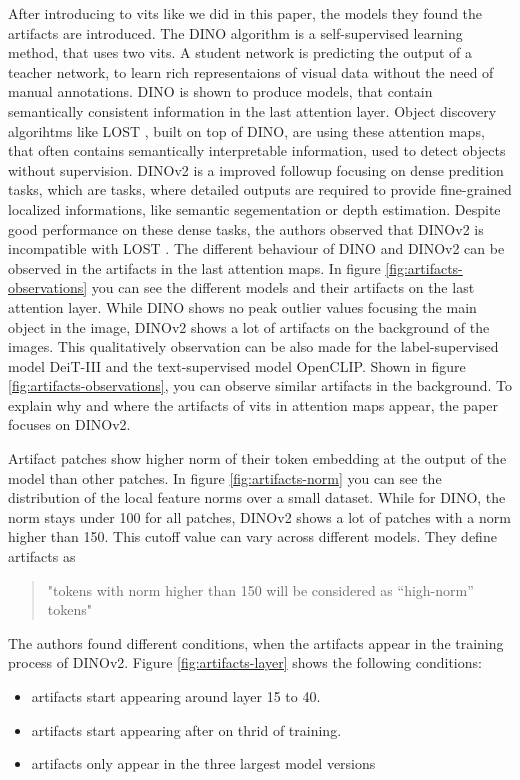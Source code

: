 \documentclass[conference]{IEEEtran}
\begin{document}
  After introducing to \acp{vit} like we did in this paper, the models they found the artifacts are introduced. The DINO algorithm is a self-supervised learning method, that uses two \acp{vit}. A student network is predicting the output of a teacher network, to learn rich representaions of visual data without the need of manual annotations. \cite{dino} DINO is shown to produce models, that contain semantically consistent information in the last attention layer. Object discovery algorihtms like LOST \cite{lost}, built on top of DINO, are using these attention maps, that often contains semantically interpretable information, used to detect objects without supervision. DINOv2 \cite{dinov2} is a improved followup focusing on dense predition tasks, which are tasks, where detailed outputs are required to provide fine-grained localized informations, like semantic segementation or depth estimation. Despite good performance on these dense tasks, the authors observed that DINOv2 is incompatible with LOST \cite{registers}. The different behaviour of DINO and DINOv2 can be observed in the artifacts in the last attention maps. In figure \ref{fig:artifacts-observations} you can see the different models and their artifacts on the last attention layer.
  While DINO shows no peak outlier values focusing the main object in the image, DINOv2 shows a lot of artifacts on the background of the images. This qualitatively observation can be also made for the label-supervised model DeiT-III and the text-supervised model OpenCLIP. Shown in figure \ref{fig:artifacts-observations}, you can observe similar artifacts in the background.
  To explain why and where the artifacts of \acp{vit} in attention maps appear, the paper focuses on DINOv2. 

  Artifact patches show higher norm of their token embedding at the output of the model than other patches. In figure \ref{fig:artifacts-norm} you can see the distribution of the local feature norms over a small dataset. While for DINO, the norm stays under 100 for all patches, DINOv2 shows a lot of patches with a norm higher than 150. This cutoff value can vary across different models. They define artifacts as
  \begin{quote}
    "tokens with norm higher than 150 will be considered as “high-norm” tokens" \cite{registers}
  \end{quote}

  The authors found different conditions, when the artifacts appear in the training process of DINOv2. Figure \ref{fig:artifacts-layer} shows the following conditions:
  \begin{itemize}
    \item artifacts start appearing around layer 15 to 40.
    \item artifacts start appearing after on thrid of training.
    \item artifacts only appear in the three largest model versions
  \end{itemize}
\end{document}
